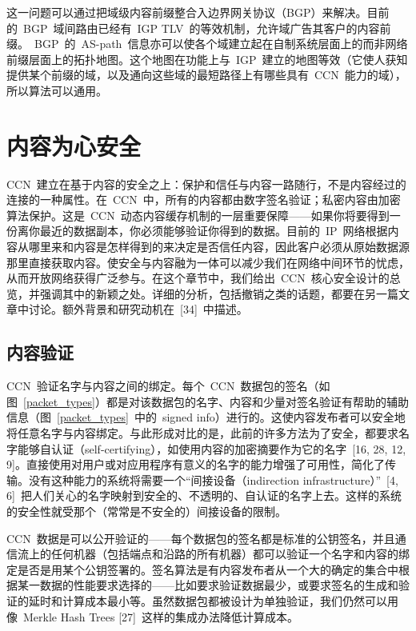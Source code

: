 这一问题可以通过把域级内容前缀整合入边界网关协议（BGP）来解决。目前的~BGP~域间路由已经有~IGP TLV~的等效机制，允许域广告其客户的内容前缀。~BGP~的~AS-path~信息亦可以使各个域建立起在自制系统层面上的而非网络前缀层面上的拓扑地图。这个地图在功能上与~IGP~建立的地图等效（它使人获知提供某个前缀的域，以及通向这些域的最短路径上有哪些具有~CCN~能力的域），所以算法可以通用。


\section{内容为心安全}
\label{sec:5}
CCN~建立在基于内容的安全之上：保护和信任与内容一路随行，不是内容经过的连接的一种属性。在~CCN~中，所有的内容都由数字签名验证；私密内容由加密算法保护。这是~CCN~动态内容缓存机制的一层重要保障——如果你将要得到一份离你最近的数据副本，你必须能够验证你得到的数据。目前的~IP~网络根据内容从哪里来和内容是怎样得到的来决定是否信任内容，因此客户必须从原始数据源那里直接获取内容。使安全与内容融为一体可以减少我们在网络中间环节的忧虑，从而开放网络获得广泛参与。在这个章节中，我们给出~CCN~核心安全设计的总览，并强调其中的新颖之处。详细的分析，包括撤销之类的话题，都要在另一篇文章中讨论。额外背景和研究动机在~[34]~中描述。

\subsection{内容验证}
\label{sec:5.1}
CCN~验证名字与内容之间的绑定。每个~CCN~数据包的签名（如图~\ref{packet_types}）都是对该数据包的名字、内容和少量对签名验证有帮助的辅助信息（图~\ref{packet_types}~中的~signed info）进行的。这使内容发布者可以安全地将任意名字与内容绑定。与此形成对比的是，此前的许多方法为了安全，都要求名字能够自认证（self-certifying），如使用内容的加密摘要作为它的名字~[16, 28, 12, 9]。直接使用对用户或对应用程序有意义的名字的能力增强了可用性，简化了传输。没有这种能力的系统将需要一个“间接设备（indirection infrastructure）”~[4, 6]~把人们关心的名字映射到安全的、不透明的、自认证的名字上去。这样的系统的安全性就受那个（常常是不安全的）间接设备的限制。

CCN~数据是可以公开验证的——每个数据包的签名都是标准的公钥签名，并且通信流上的任何机器（包括端点和沿路的所有机器）都可以验证一个名字和内容的绑定是否是用某个公钥签署的。签名算法是有内容发布者从一个大的确定的集合中根据某一数据的性能要求选择的——比如要求验证数据最少，或要求签名的生成和验证的延时和计算成本最小等。虽然数据包都被设计为单独验证，我们仍然可以用像~Merkle Hash Trees [27]~这样的集成办法降低计算成本。

